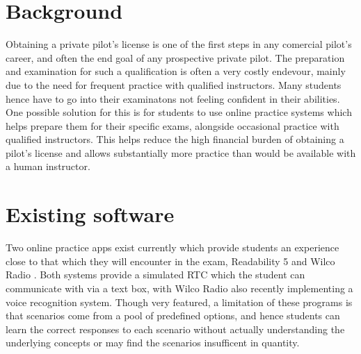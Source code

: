 \section{Background}
Obtaining a private pilot's license is one of the first steps in any comercial pilot's career, and often the end goal of any prospective private pilot.
The preparation and examination for such a qualification is often a very costly endevour, mainly due to the need for frequent practice with qualified instructors.
Many students hence have to go into their examinatons not feeling confident in their abilities.
\\
One possible solution for this is for students to use online practice systems which helps prepare them for their specific exams, alongside occasional practice with qualified instructors.
This helps reduce the high financial burden of obtaining a pilot's license and allows substantially more practice than would be available with a human instructor.
\section{Existing software}
Two online practice apps exist currently which provide students an experience close to that which they will encounter in the exam, Readability 5 \cite{readability} and Wilco Radio \cite{wilcoradio}.
Both systems provide a simulated RTC which the student can communicate with via a text box, with Wilco Radio also recently implementing a voice recognition system.
Though very featured, a limitation of these programs is that scenarios come from a pool of predefined options, and hence students can learn the correct responses to each scenario without actually understanding the underlying concepts or may find the scenarios insufficent in quantity.


